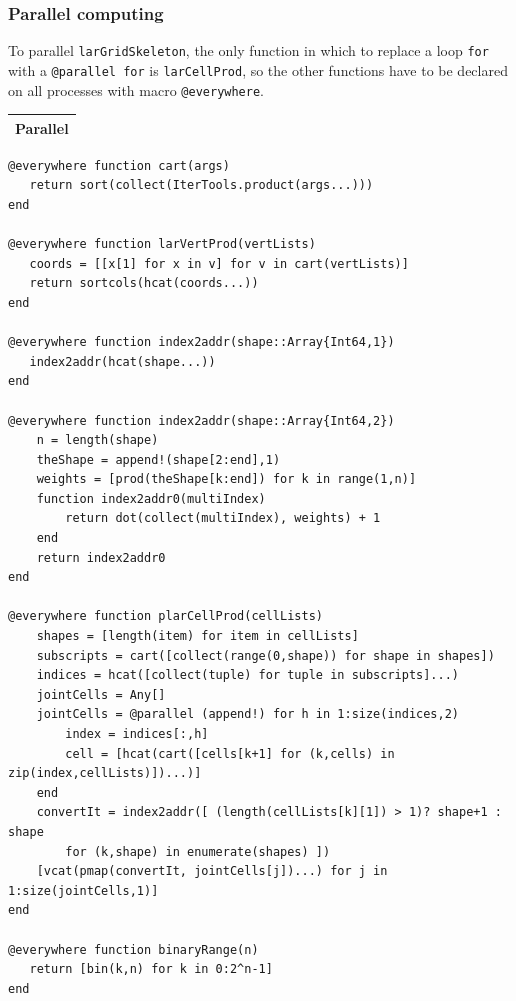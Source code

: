 \documentclass{article}
\begin{document}
\begin{flushleft}
\vspace{2ex}
\subsubsection{Parallel computing}
To parallel \texttt{larGridSkeleton}, the only function in which to replace a loop \texttt{for} with a \texttt{@parallel for} is \texttt{larCellProd}, so the other functions have to be declared on all processes with macro \texttt{@everywhere}. 
\vspace{1ex}
\begin{center}
\begin{tabular}{|p{16cm}|}
\hline
\cellcolor[gray]{.9}Parallel\\
\hline
\end{tabular}
\end{center}
\vspace{2ex}
\begin{list}{}{} \item
   \begin{Verbatim}[tabsize=4]
@everywhere function cart(args)
   return sort(collect(IterTools.product(args...)))
end

@everywhere function larVertProd(vertLists)
   coords = [[x[1] for x in v] for v in cart(vertLists)]
   return sortcols(hcat(coords...))
end

@everywhere function index2addr(shape::Array{Int64,1})
   index2addr(hcat(shape...))
end

@everywhere function index2addr(shape::Array{Int64,2})
    n = length(shape)
    theShape = append!(shape[2:end],1)
    weights = [prod(theShape[k:end]) for k in range(1,n)]
    function index2addr0(multiIndex)
        return dot(collect(multiIndex), weights) + 1
    end
    return index2addr0
end

@everywhere function plarCellProd(cellLists)
	shapes = [length(item) for item in cellLists]
	subscripts = cart([collect(range(0,shape)) for shape in shapes])
	indices = hcat([collect(tuple) for tuple in subscripts]...)
	jointCells = Any[]
	jointCells = @parallel (append!) for h in 1:size(indices,2)
		index = indices[:,h]
		cell = [hcat(cart([cells[k+1] for (k,cells) in zip(index,cellLists)])...)]
	end
	convertIt = index2addr([ (length(cellLists[k][1]) > 1)? shape+1 : shape 
		for (k,shape) in enumerate(shapes) ])     
	[vcat(pmap(convertIt, jointCells[j])...) for j in 1:size(jointCells,1)]
end

@everywhere function binaryRange(n)
   return [bin(k,n) for k in 0:2^n-1]
end


\end{Verbatim}
\end{list}
\end{flushleft}
\end{document}
